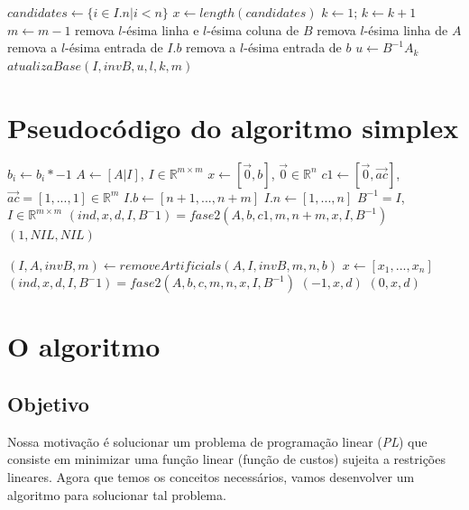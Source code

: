 \documentclass[12pt]{article}
\begin{document}
\begin{algorithmic}
		\State $candidates \gets \{i \in I.n | i< n\}$
		\State $x \gets length(candidates)$
		\State $k \gets 1$;
			\State $k \gets k + 1$
		\EndWhile
			\State $m \gets m - 1$
			\State remova $l$-ésima linha e $l$-ésima coluna de $B$
			\State remova $l$-ésima linha de $A$
			\State remova a $l$-ésima entrada de $I.b$
			\State remova a $l$-ésima entrada de $b$
		\Else
			\State $u \gets B^{-1}A_k$ 
			\State $atualizaBase(I, invB, u, l, k, m)$
		\EndIf 
	\EndFor
\EndFunction
\end{algorithmic}
	
\section{Pseudocódigo do algoritmo simplex}
\begin{algorithmic}
		\State $b_i \gets b_i * -1$
	\EndFor
	\State $A \gets [A | I]$, $I \in \mathbb{R}^{m \times m}$
	\State $x \gets [\vec{0}, b]$, $\vec{0} \in \mathbb{R}^{n}$
	\State $c1 \gets [\vec{0}, \vec{ac}]$, $\vec{ac} = [1, ..., 1] \in \mathbb{R}^m$
	\State $I.b \gets [n + 1, ..., n + m]$
	\State $I.n \gets [1, ..., n]$
	\State $B^{-1} = I$, $I \in \mathbb{R}^{m \times m}$
	\State $(ind, x, d, I, B^-1) = fase2(A, b, c1, m, n + m, x, I, B^{-1})$
		\Return $(1, NIL, NIL)$
	
	\EndIf
	\State $(I, A, invB, m) \gets removeArtificials (A, I, invB, m, n, b)$
	\State $x \gets [x_1, ..., x_n]$
	\State $(ind, x, d, I, B^-1) = fase2(A, b, c, m, n, x, I, B^{-1})$
		\Return $(-1, x, d)$
	\Else
		\Return $(0, x, d)$
	\EndIf
\EndFunction
\end{algorithmic}

\section{O algoritmo}

\subsection{Objetivo}
	Nossa motivação é solucionar um problema de programação linear (\emph{PL}) que consiste em minimizar uma função linear (função de custos) sujeita a restrições lineares. Agora que temos os conceitos necessários, vamos desenvolver um algoritmo para solucionar tal problema.
\end{document}
